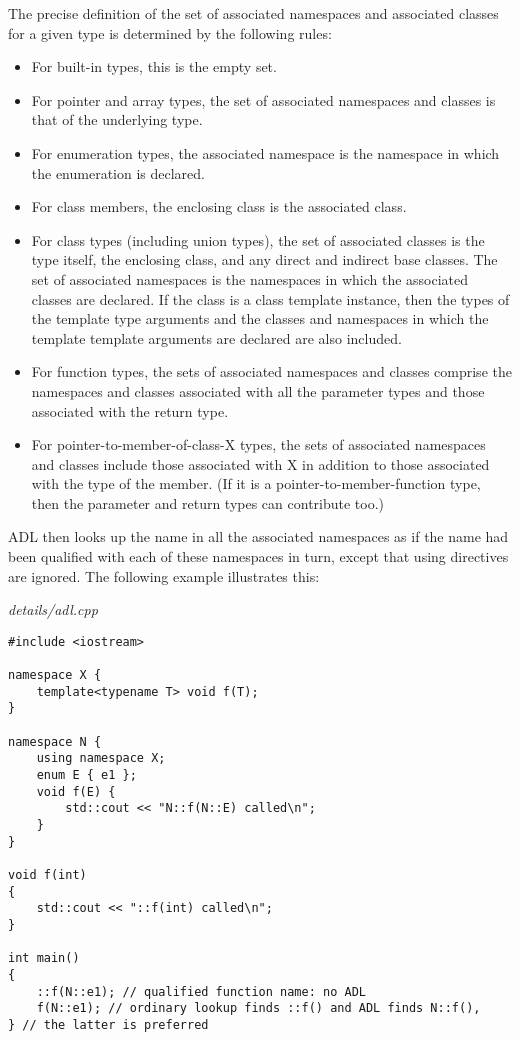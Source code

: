 The precise definition of the set of associated namespaces and associated classes for a given type is determined by the following rules:

\begin{itemize}
\item 
For built-in types, this is the empty set.

\item 
For pointer and array types, the set of associated namespaces and classes is that of the underlying type.

\item 
For enumeration types, the associated namespace is the namespace in which the enumeration is declared.

\item 
For class members, the enclosing class is the associated class.

\item 
For class types (including union types), the set of associated classes is the type itself, the enclosing class, and any direct and indirect base classes. The set of associated namespaces is the namespaces in which the associated classes are declared. If the class is a class template instance, then the types of the template type arguments and the classes and namespaces in which the template template arguments are declared are also included.

\item 
For function types, the sets of associated namespaces and classes comprise the namespaces and classes associated with all the parameter types and those associated with the return type.

\item 
For pointer-to-member-of-class-X types, the sets of associated namespaces and classes include those associated with X in addition to those associated with the type of the member. (If it is a pointer-to-member-function type, then the parameter and return types can contribute too.)
\end{itemize}

ADL then looks up the name in all the associated namespaces as if the name had been qualified with each of these namespaces in turn, except that using directives are ignored. The following example illustrates this:

\noindent
\textit{details/adl.cpp}
\begin{lstlisting}[style=styleCXX]
#include <iostream>

namespace X {
	template<typename T> void f(T);
}

namespace N {
	using namespace X;
	enum E { e1 };
	void f(E) {
		std::cout << "N::f(N::E) called\n";
	}
}

void f(int)
{
	std::cout << "::f(int) called\n";
}

int main()
{
	::f(N::e1); // qualified function name: no ADL
	f(N::e1); // ordinary lookup finds ::f() and ADL finds N::f(),
} // the latter is preferred
\end{lstlisting}

